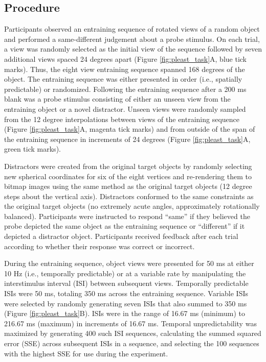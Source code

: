 \documentclass[dwyatte_dissertation.tex]{subfiles}
\begin{document}
\subsection{Procedure}
Participants observed an entraining sequence of rotated views of a random object and performed a same-different judgement about a probe stimulus. On each trial, a view was randomly selected as the initial view of the sequence followed by seven additional views spaced 24 degrees apart (Figure \ref{fig:pleast_task}A, blue tick marks). Thus, the eight view entraining sequence spanned 168 degrees of the object. The entraining sequence was either presented in order (i.e., spatially predictable) or randomized. Following the entraining sequence after a 200 ms blank was a probe stimulus consisting of either an unseen view from the entraining object or a novel distractor. Unseen views were randomly sampled from the 12 degree interpolations between views of the entraining sequence (Figure \ref{fig:pleast_task}A, magenta tick marks) and from outside of the span of the entraining sequence in increments of 24 degrees (Figure \ref{fig:pleast_task}A, green tick marks).

Distractors were created from the original target objects by randomly selecting new spherical coordinates for six of the eight vertices and re-rendering them to bitmap images using the same method as the original target objects (12 degree steps about the vertical axis). Distractors conformed to the same constraints as the original target objects (no extremely acute angles, approximately rotationally balanced). Participants were instructed to respond ``same'' if they believed the probe depicted the same object as the entraining sequence or ``different'' if it depicted a distractor object. Participants received feedback after each trial according to whether their response was correct or incorrect. %

During the entraining sequence, object views were presented for 50 ms at either 10 Hz (i.e., temporally predictable) or at a variable rate by manipulating the interstimulus interval (ISI) between subsequent views. Temporally predictable ISIs were 50 ms, totaling 350 ms across the entraining sequence. Variable ISIs were selected by randomly generating seven ISIs that also summed to 350 ms (Figure \ref{fig:pleast_task}B). ISIs were in the range of 16.67 ms (minimum) to 216.67 ms (maximum) in increments of 16.67 ms. Temporal unpredictability was maximized by generating 400 such ISI sequences, calculating the summed squared error (SSE) across subsequent ISIs in a sequence, and selecting the 100 sequences with the highest SSE for use during the experiment.
\end{document}
